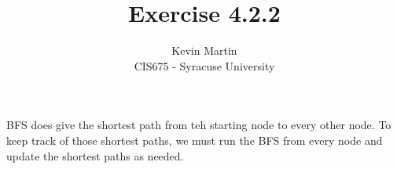 \documentclass{article}
\author{Kevin Martin\\ CIS675 - Syracuse University}
\title{Exercise 4.2.2}
\begin{document}
\maketitle
BFS does give the shortest path from teh starting node to every other node.
To keep track of those shortest paths, we must run the BFS from every node
and update the shortest paths as needed.
\end{document}

